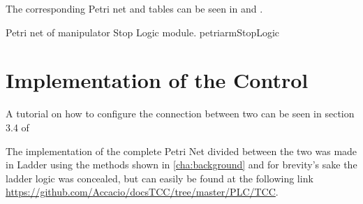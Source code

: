 The corresponding Petri net and tables can be seen in
 and
.
\newline


{Petri net of manipulator Stop Logic module.}
{petriarmStopLogic}

\section{Implementation of the Control}
A tutorial on how to configure the connection between two \PLCs{} can be seen in
section 3.4 of \cite{rochapereira2019automacao}

The implementation of the complete Petri Net divided between the two \PLCs{} was
made in Ladder using the methods shown in \autoref{cha:background}  and for
brevity's sake the ladder logic was concealed, but can easily be
found at the following link
\url{https://github.com/Accacio/docsTCC/tree/master/PLC/TCC}.




